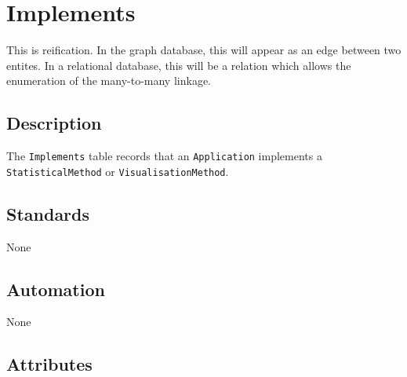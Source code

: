 \documentclass[
]{article}
\begin{document}
\section{Implements}\label{implements}

This is reification. In the graph database, this will appear as an edge
between two entites. In a relational database, this will be a relation
which allows the enumeration of the many-to-many linkage.

\subsection{Description}\label{description-14}

The \texttt{Implements} table records that an \texttt{Application}
implements a \texttt{StatisticalMethod} or \texttt{VisualisationMethod}.

\subsection{Standards}\label{standards-16}

None

\subsection{Automation}\label{automation-16}

None

\subsection{Attributes}\label{attributes-14}
\end{document}
